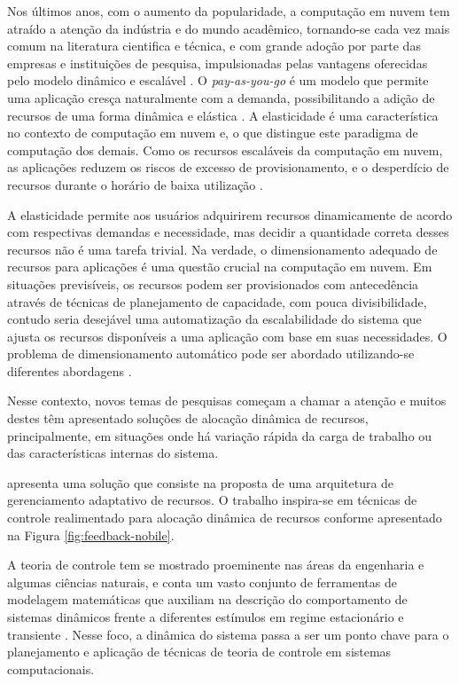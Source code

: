 Nos últimos anos, com o aumento da popularidade, a computação em nuvem tem atraído a atenção da indústria e do mundo acadêmico, tornando-se cada vez mais comum na literatura cientifica e técnica, e com grande adoção por parte das empresas e instituições de pesquisa, impulsionadas pelas vantagens oferecidas pelo modelo dinâmico e escalável . O \textit{pay-as-you-go} é um modelo que permite uma aplicação cresça naturalmente com a demanda, possibilitando a adição de recursos de uma forma dinâmica e elástica \cite{vazquez2014}. 
A elasticidade é uma característica  no contexto de computação em nuvem e, o que distingue este paradigma de computação dos demais. Como os recursos escaláveis da computação em nuvem, as aplicações reduzem os riscos de excesso de provisionamento, e o desperdício de recursos durante o horário de baixa utilização \cite{vazquez2014, galante2012}.

A elasticidade permite aos usuários adquirirem recursos dinamicamente de acordo com respectivas demandas e necessidade, mas decidir a quantidade correta desses recursos não é uma tarefa trivial. Na verdade, o dimensionamento adequado de recursos para aplicações é uma questão crucial na computação em nuvem. Em situações previsíveis, os recursos podem ser provisionados com antecedência através de técnicas de planejamento de capacidade, com pouca divisibilidade, contudo seria desejável uma automatização da escalabilidade do sistema que ajusta os recursos disponíveis a uma aplicação com base em suas necessidades. O problema de dimensionamento automático pode ser abordado utilizando-se diferentes abordagens \cite{Tania2012}.  

Nesse contexto, novos temas de pesquisas começam a chamar a atenção e muitos destes têm apresentado soluções de alocação dinâmica de recursos, principalmente, em situações onde há variação rápida da carga de trabalho ou das características internas do sistema. 

 apresenta uma solução que consiste na proposta de uma arquitetura de gerenciamento adaptativo de recursos. O trabalho inspira-se em técnicas de controle realimentado para alocação dinâmica de recursos conforme apresentado na Figura \ref{fig:feedback-nobile}.

A teoria de controle tem se mostrado proeminente nas áreas da engenharia e algumas ciências naturais, e conta um vasto conjunto de ferramentas de modelagem matemáticas que auxiliam na descrição do comportamento de sistemas dinâmicos frente a diferentes estímulos em regime estacionário e transiente \cite{Nobile2013}. Nesse foco, a dinâmica do sistema passa a ser um ponto chave para o planejamento e aplicação de técnicas de teoria de controle em sistemas computacionais. 

